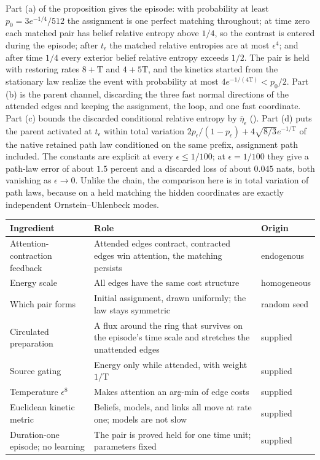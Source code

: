 Part (a) of the proposition gives the episode: with probability at least \(p_0=3e^{-1/4}/512\) the assignment
is one perfect matching throughout; at time zero each matched pair has belief relative entropy above
\(1/4\), so the contrast is entered during the episode; after \(t_\epsilon\) the matched relative entropies are
at most \(\epsilon^4\); and after time \(1/4\) every exterior belief relative entropy exceeds \(1/2\). The pair
is held with restoring rates \(8+\mathrm T\) and \(4+5\mathrm T\), and the kinetics started from the
stationary law realize the event with probability at most \(4e^{-1/(4\mathrm T)}<p_0/2\). Part (b) is the
parent channel, discarding the three fast normal directions of the attended edges and keeping the
assignment, the loop, and one fast coordinate. Part (c) bounds the discarded conditional relative entropy
by \(\bar\eta_\epsilon\) (). Part (d) puts the parent activated at
\(t_\epsilon\) within total variation \(2p_\epsilon/(1-p_\epsilon)+4\sqrt{8/3}e^{-1/\mathrm T}\) of the native
retained path law conditioned on the same prefix, assignment path included. The constants are explicit at every \(\epsilon\le1/100\); at
\(\epsilon=1/100\) they give a path-law error of about \(1.5\) percent and a discarded loss of about \(0.045\)
nats, both vanishing as \(\epsilon\to0\). Unlike the chain, the comparison here is in total variation of path
laws, because on a held matching the hidden coordinates are exactly independent Ornstein--Uhlenbeck modes.

\begin{center}
\small
\begin{tabular}{@{}>{\raggedright\arraybackslash}p{}>{\raggedright\arraybackslash}p{}>{\raggedright\arraybackslash}p{}@{}}
\toprule
Ingredient & Role & Origin \\
\midrule
Attention-contraction feedback & Attended edges contract, contracted edges win attention, the matching persists & endogenous \\
Energy scale & All edges have the same cost structure & homogeneous \\
Which pair forms & Initial assignment, drawn uniformly; the law stays symmetric & random seed \\
Circulated preparation & A flux around the ring that survives on the episode's time scale and stretches the unattended edges & supplied \\
Source gating & Energy only while attended, with weight \(1/\mathrm T\) & supplied \\
Temperature \(\epsilon^8\) & Makes attention an arg-min of edge costs & supplied \\
Euclidean kinetic metric & Beliefs, models, and links all move at rate one; models are not slow & supplied \\
Duration-one episode; no learning & The pair is proved held for one time unit; parameters fixed & supplied \\
\bottomrule
\end{tabular}
\end{center}

